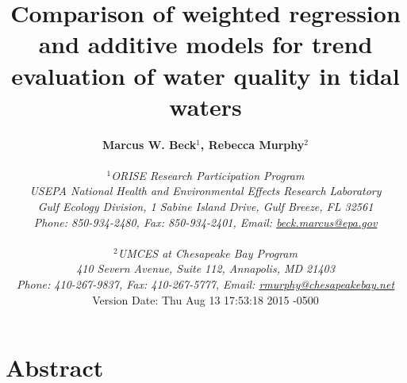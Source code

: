 \documentclass[letterpaper,12pt,oneside]{article}\usepackage[]{graphicx}\usepackage[]{color}
\begin{document}
\raggedbottom
\raggedright
{}
\setlength{\parindent}{0.5in}
\renewcommand\refname{References \vspace{12pt}}

\begin{singlespace}
\title{{\bf {\Large Comparison of weighted regression and additive models for trend evaluation of water quality in tidal waters}}}
\author{
  {\bf {\normalsize Marcus W. Beck$^1$, Rebecca Murphy$^2$}}
  \\\\{\textit {\normalsize $^1$ORISE Research Participation Program}}
  \\{\textit {\normalsize USEPA National Health and Environmental Effects Research Laboratory}}
  \\{\textit {\normalsize Gulf Ecology Division, 1 Sabine Island Drive, Gulf Breeze, FL 32561}}
	\\{\textit {\normalsize Phone: 850-934-2480, Fax: 850-934-2401, Email: \href{mailto:beck.marcus@epa.gov}{beck.marcus@epa.gov}}}
  \\\\{\textit {\normalsize $^2$UMCES at Chesapeake Bay Program}}
	\\{\textit {\normalsize 410 Severn Avenue, Suite 112, Annapolis, MD 21403}}
	\\{\textit {\normalsize Phone: 410-267-9837, Fax: 410-267-5777, Email: \href{mailto:rmurphy@chesapeakbay.net}{rmurphy@chesapeakebay.net}}}
  \vspace{1in} 
  \\ Version Date:   Thu Aug 13 17:53:18 2015 -0500
	}
\date{}
\maketitle
\end{singlespace}
\clearpage

\section*{Abstract}
\end{document}
